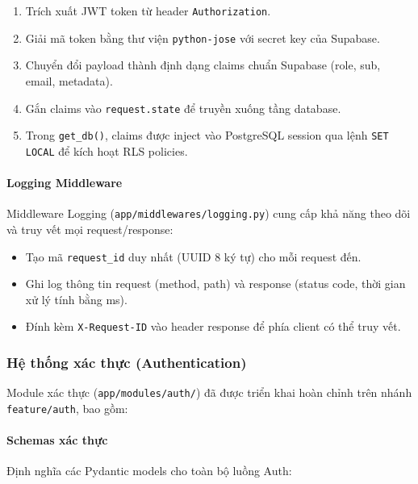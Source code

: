 \documentclass[a4paper,12pt]{article}
\begin{document}
\begin{enumerate}
    \item Trích xuất JWT token từ header \texttt{Authorization}.
    \item Giải mã token bằng thư viện \texttt{python-jose} với secret key của Supabase.
    \item Chuyển đổi payload thành định dạng claims chuẩn Supabase (role, sub, email, metadata).
    \item Gắn claims vào \texttt{request.state} để truyền xuống tầng database.
    \item Trong \texttt{get\_db()}, claims được inject vào PostgreSQL session qua lệnh \texttt{SET LOCAL} để kích hoạt RLS policies.
\end{enumerate}

\paragraph{Logging Middleware}

Middleware Logging (\texttt{app/middlewares/logging.py}) cung cấp khả năng theo dõi và truy vết mọi request/response:

\begin{itemize}
    \item Tạo mã \texttt{request\_id} duy nhất (UUID 8 ký tự) cho mỗi request đến.
    \item Ghi log thông tin request (method, path) và response (status code, thời gian xử lý tính bằng ms).
    \item Đính kèm \texttt{X-Request-ID} vào header response để phía client có thể truy vết.
\end{itemize}

\subsubsection{Hệ thống xác thực (Authentication)}

Module xác thực (\texttt{app/modules/auth/}) đã được triển khai hoàn chỉnh trên nhánh \texttt{feature/auth}, bao gồm:

\paragraph{Schemas xác thực}

Định nghĩa các Pydantic models cho toàn bộ luồng Auth:
\end{document}
